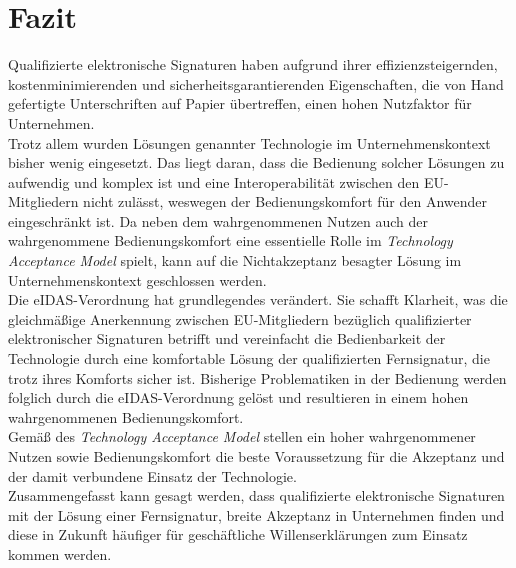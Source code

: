 \documentclass[deutsch]{lib/llncs/llncs}
\begin{document}
\section{Fazit}
Qualifizierte elektronische Signaturen haben aufgrund ihrer effizienzsteigernden, kostenminimierenden und sicherheitsgarantierenden Eigenschaften, die von Hand gefertigte Unterschriften auf Papier übertreffen, einen hohen Nutzfaktor für Unternehmen. \\
Trotz allem wurden Lösungen genannter Technologie im Unternehmenskontext bisher wenig eingesetzt. Das liegt daran, dass die Bedienung solcher Lösungen zu aufwendig und komplex ist und eine Interoperabilität zwischen den EU-Mitgliedern nicht zulässt, weswegen der Bedienungskomfort für den Anwender eingeschränkt ist. Da neben dem wahrgenommenen Nutzen auch der wahrgenommene Bedienungskomfort eine essentielle Rolle im \textit{Technology Acceptance Model} spielt, kann auf die Nichtakzeptanz besagter Lösung im Unternehmenskontext geschlossen werden. \\
Die eIDAS-Verordnung hat grundlegendes verändert. Sie schafft Klarheit, was die gleichmäßige Anerkennung zwischen EU-Mitgliedern bezüglich qualifizierter elektronischer Signaturen betrifft und vereinfacht die Bedienbarkeit der Technologie durch eine komfortable Lösung der qualifizierten Fernsignatur, die trotz ihres Komforts sicher ist. Bisherige Problematiken in der Bedienung werden folglich durch die eIDAS-Verordnung gelöst und resultieren in einem hohen wahrgenommenen Bedienungskomfort. \\
Gemäß des \textit{Technology Acceptance Model} stellen ein hoher wahrgenommener Nutzen sowie Bedienungskomfort die beste Voraussetzung für die Akzeptanz und der damit verbundene Einsatz der Technologie. \\
Zusammengefasst kann gesagt werden, dass qualifizierte elektronische Signaturen mit der Lösung einer Fernsignatur, breite Akzeptanz in Unternehmen finden und diese in Zukunft häufiger für geschäftliche Willenserklärungen zum Einsatz kommen werden.




\end{document}
